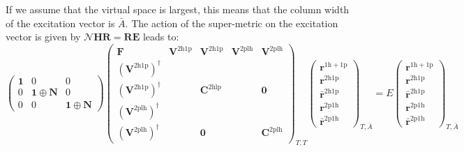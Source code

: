  If we assume that the virtual space is largest, this means that the column width of the excitation vector is $\bar{A}$. The action of the super-metric on the excitation vector is given by
$\bm{\mathcal{N}} \bm{H} \bm{R} = \bm{R} \bm{E}$ leads to:
\begin{equation}
\begin{pmatrix}
\bm{1} & 0 & 0 \\
0 & \bm{1} \oplus \bm{N} & 0 \\
0 & 0 & \bm{1} \oplus \bm{N}
\end{pmatrix}
\begin{pmatrix}
\bm{F} & \bm{V}^{2\mathrm{h1p}} & \bm{V}^{2\mathrm{h1p}} & \bm{V}^{2\mathrm{plh}} & \bm{V}^{2\mathrm{plh}} \\
\left(\bm{V}^{2\mathrm{h1p}}\right)^{\dagger} &  &  & & \\
\left(\bm{V}^{2\mathrm{h1p}}\right)^{\dagger} &  & \bm{C}^{2\mathrm{hlp}} & & \bm{0} \\
\left(\bm{V}^{2\mathrm{plh}}\right)^{\dagger} & & & & \\
\left(\bm{V}^{2\mathrm{plh}}\right)^{\dagger} &  & \bm{0} & & \bm{C}^{2\mathrm{plh}}
\end{pmatrix}_{T,T}
\begin{pmatrix}
\bm{r}^{1\mathrm{h}+1\mathrm{p}} \\
\bm{r}^{2\mathrm{h}1\mathrm{p}} \\
\bm{\bar{r}}^{2\mathrm{h}1\mathrm{p}} \\
\bm{r}^{2\mathrm{p}1\mathrm{h}} \\
\bm{\bar{r}}^{2\mathrm{p}1\mathrm{h}}
\end{pmatrix}_{T,\bar{A}} = E
\begin{pmatrix}
\bm{r}^{1\mathrm{h}+1\mathrm{p}} \\
\bm{r}^{2\mathrm{h}1\mathrm{p}} \\
\bm{\bar{r}}^{2\mathrm{h}1\mathrm{p}} \\
\bm{r}^{2\mathrm{p}1\mathrm{h}} \\
\bm{\bar{r}}^{2\mathrm{p}1\mathrm{h}}
\end{pmatrix}_{T,\bar{A}}
\end{equation}


